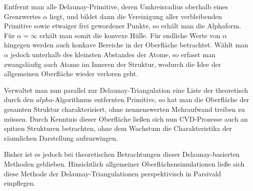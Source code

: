 Entfernt man alle Delaunay-Primitive, deren Umkreisradius oberhalb eines Grenzwertes $\alpha$ liegt, und bildet dann die Vereinigung aller verbleibenden Primitive sowie etwaiger frei gewordener Punkte, so erhält man die Alphaform.
Für $\alpha = \infty$ erhält man somit die konvexe Hülle.
Für endliche Werte von $\alpha$ hingegen werden auch konkave Bereiche in der Oberfläche betrachtet.
Wählt man $\alpha$ jedoch unterhalb des kleinsten Abstandes der Atome, so erfasst man zwangsläufig auch Atome im Inneren der Struktur, wodurch die Idee der allgemeinen Oberfläche wieder verloren geht.

Verwaltet man nun parallel zur Delaunay-Triangulation eine Liste der theoretisch durch den $alpha$-Algorithmus entfernten Primitive, so hat man die Oberfläche der gesamten Struktur charakterisiert, ohne nennenswerten Mehraufwand treiben zu müssen.
Durch Kenntnis dieser Oberfläche ließen sich nun CVD-Prozesse auch an spitzen Strukturen betrachten, ohne dem Wachstum die Charakteristika der räumlichen Darstellung aufzuzwingen.

Bisher ist es jedoch bei theoretischen Betrachtungen dieser Delaunay-basierten Methoden geblieben.
Hinsichtlich allgemeiner Oberflächensimulationen ließe sich diese Methode der Delaunay-Triangulationen perspektivisch in Parsivald einpflegen.
